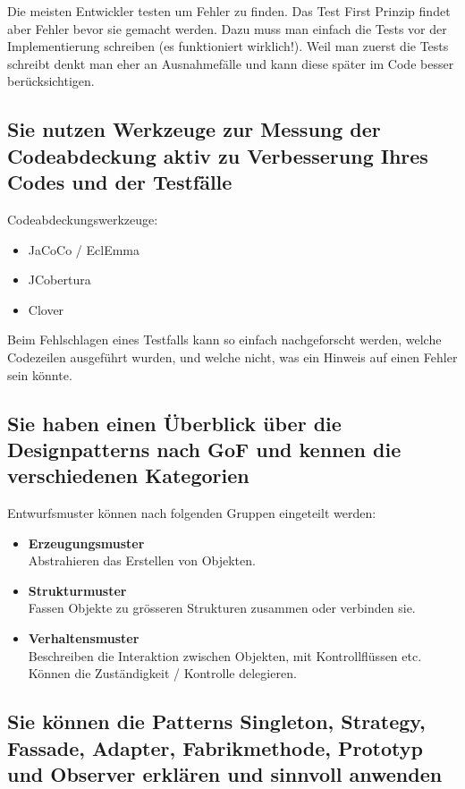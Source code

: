 Die meisten Entwickler testen um Fehler zu finden. Das Test First Prinzip findet aber Fehler bevor sie gemacht werden. 
Dazu muss man einfach die Tests vor der Implementierung schreiben (es funktioniert wirklich!). 
Weil man zuerst die Tests schreibt denkt man eher an Ausnahmefälle und kann diese später im Code besser berücksichtigen.

\subsection{Sie nutzen Werkzeuge zur Messung der Codeabdeckung aktiv zu Verbesserung Ihres Codes und der Testfälle}

Codeabdeckungswerkzeuge:
\begin{itemize}
	\item JaCoCo / EclEmma
	\item JCobertura
	\item Clover
\end{itemize}
Beim Fehlschlagen eines Testfalls kann so einfach nachgeforscht werden, welche Codezeilen ausgeführt wurden, und welche nicht, was ein Hinweis auf einen Fehler sein könnte.

\subsection{Sie haben einen Überblick über die Designpatterns nach GoF und kennen die verschiedenen Kategorien}


Entwurfsmuster können nach folgenden Gruppen eingeteilt werden:
\begin{itemize}
  \item \textbf{Erzeugungsmuster} \\
  Abstrahieren das Erstellen von Objekten.
  \item \textbf{Strukturmuster} \\
  Fassen Objekte zu grösseren Strukturen zusammen oder verbinden sie.
  \item \textbf{Verhaltensmuster} \\
  Beschreiben die Interaktion zwischen Objekten, mit Kontrollflüssen etc. Können die Zuständigkeit / Kontrolle delegieren.
  
\end{itemize}

\subsection{Sie können die Patterns Singleton, Strategy, Fassade, Adapter, Fabrikmethode, Prototyp und Observer erklären und sinnvoll anwenden}
\label{sec:patterns}

